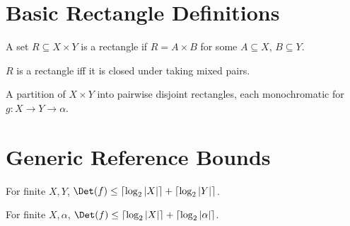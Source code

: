 \section{Basic Rectangle Definitions}

\begin{definition}[Rectangle]
  \label{def:rectangle}
  \leanok
  A set $R \subseteq X \times Y$ is a rectangle if $R = A \times B$ for some
  $A \subseteq X$, $B \subseteq Y$.
\end{definition}

\begin{lemma}
  \label{lem:rectangle_iff}
  \leanok
  $R$ is a rectangle iff it is closed under taking mixed pairs.
\end{lemma}

\begin{definition}
  \label{def:mono_rect_partition}
  \leanok
  A partition of $X \times Y$ into pairwise disjoint rectangles, each monochromatic
  for $g : X \to Y \to \alpha$.
\end{definition}

\section{Generic Reference Bounds}

\begin{theorem}
  \label{thm:det_cc_le_clog}
  \leanok
  For finite $X,Y$, $\Det(f) \le \lceil \log_2 |X| \rceil + \lceil \log_2 |Y| \rceil$.
\end{theorem}

\begin{theorem}
  \label{thm:det_cc_le_clog_X_alpha}
  \leanok
  For finite $X,\alpha$, $\Det(f) \le \lceil \log_2 |X| \rceil + \lceil \log_2 |\alpha| \rceil$.
\end{theorem}
